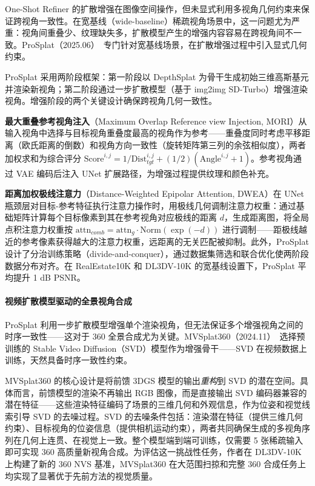 One-Shot Refiner 的扩散增强在图像空间操作，但未显式利用多视角几何约束来保证跨视角一致性。在宽基线（wide-baseline）稀疏视角场景中，这一问题尤为严重：视角间重叠少、纹理缺失多，扩散模型产生的增强内容容易在跨视角间不一致。ProSplat（2025.06）~\cite{2506_07670}专门针对宽基线场景，在扩散增强过程中引入显式几何约束。

ProSplat 采用两阶段框架：第一阶段以 DepthSplat 为骨干生成初始三维高斯基元并渲染新视角；第二阶段通过一步扩散模型（基于 img2img SD-Turbo）增强渲染视角。增强阶段的两个关键设计确保跨视角几何一致性。

\textbf{最大重叠参考视角注入}（Maximum Overlap Reference view Injection, MORI）从输入视角中选择与目标视角重叠度最高的视角作为参考——重叠度同时考虑平移距离（欧氏距离的倒数）和视角方向一致性（旋转矩阵第三列的余弦相似度），两者加权求和为综合评分 $\text{Score}^{i,j} = 1/\text{Dist}^{i,j}_{tgt} + (1/2)(\text{Angle}^{i,j} + 1)$。参考视角通过 VAE 编码后注入 UNet 扩展路径，为增强过程提供纹理和颜色补充。

\textbf{距离加权极线注意力}（Distance-Weighted Epipolar Attention, DWEA）在 UNet 瓶颈层对目标-参考特征执行注意力操作时，用极线几何调制注意力权重：通过基础矩阵计算每个目标像素到其在参考视角对应极线的距离 $d$，生成距离图，将全局点积注意力权重按 $\text{attn}_{comb} = \text{attn}_g \cdot \text{Norm}(\exp(-d))$ 进行调制——距极线越近的参考像素获得越大的注意力权重，远距离的无关匹配被抑制。此外，ProSplat 设计了分治训练策略（divide-and-conquer），通过数据集筛选和联合优化使两阶段数据分布对齐。在 RealEstate10K 和 DL3DV-10K 的宽基线设置下，ProSplat 平均提升 1 dB PSNR。

\paragraph{视频扩散模型驱动的全景视角合成}

ProSplat 利用一步扩散模型增强单个渲染视角，但无法保证多个增强视角之间的时序一致性——这对于 360\textdegree{} 全景合成尤为关键。MVSplat360（2024.11）~\cite{2411_04924}选择预训练的 Stable Video Diffusion（SVD）模型作为增强骨干——SVD 在视频数据上训练，天然具备时序一致性约束。

MVSplat360 的核心设计是将前馈 3DGS 模型的输出\emph{重构}到 SVD 的潜在空间。具体而言，前馈模型的渲染不再输出 RGB 图像，而是直接输出 SVD 编码器兼容的潜在特征——这些渲染特征编码了场景的三维几何和外观信息，作为位姿和视觉线索引导 SVD 的去噪过程。SVD 的去噪条件包括：渲染潜在特征（提供三维几何约束）、目标视角的位姿信息（提供相机运动约束），两者共同确保生成的多视角序列在几何上连贯、在视觉上一致。整个模型端到端可训练，仅需要 5 张稀疏输入即可实现 360\textdegree{} 高质量新视角合成。为评估这一挑战性任务，作者在 DL3DV-10K 上构建了新的 360\textdegree{} NVS 基准，MVSplat360 在大范围扫掠和完整 360\textdegree{} 合成任务上均实现了显著优于先前方法的视觉质量。

